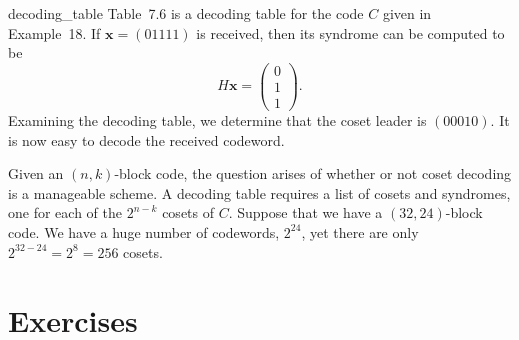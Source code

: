 
\begin{example}{decoding_table}
Table~7.6 is a decoding table for the code $C$ given in Example~18. If
${\mathbf x} = (01111)$ is received, then its syndrome can be computed
to be
\[
H {\mathbf x} =
\begin{pmatrix}
0 \\ 1 \\ 1
\end{pmatrix}.
\]
Examining the decoding table, we determine that the coset leader is
$(00010)$. It is now easy to decode the received codeword. 
\end{example}
 
 
Given an $(n,k)$-block code, the question arises of whether or not
coset decoding is a manageable scheme.  A decoding table requires a
list of cosets and syndromes, one for each of the $2^{n-k}$ cosets of
$C$.  Suppose that we have a $(32, 24)$-block code.  We have a huge
number of codewords, $2^{24}$, yet there are only $2^{32-24} = 2^{8} =
256$ cosets.  
 

 
 
 
 
\section*{Exercises}
\exrule
 
 
 
